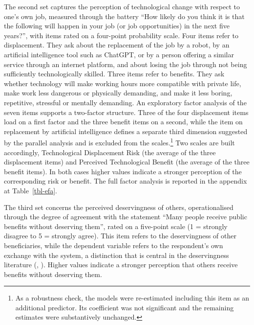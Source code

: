\documentclass[
  12pt,
]{article}
\begin{document}
The second set captures the perception of technological change with
respect to one's own job, measured through the battery ``How likely do
you think it is that the following will happen in your job (or job
opportunities) in the next five years?'', with items rated on a
four-point probability scale. Four items refer to displacement. They ask
about the replacement of the job by a robot, by an artificial
intelligence tool such as ChatGPT, or by a person offering a similar
service through an internet platform, and about losing the job through
not being sufficiently technologically skilled. Three items refer to
benefits. They ask whether technology will make working hours more
compatible with private life, make work less dangerous or physically
demanding, and make it less boring, repetitive, stressful or mentally
demanding. An exploratory factor analysis of the seven items supports a
two-factor structure. Three of the four displacement items load on a
first factor and the three benefit items on a second, while the item on
replacement by artificial intelligence defines a separate third
dimension suggested by the parallel analysis and is excluded from the
scales.\footnote{As a robustness check, the models were re-estimated
  including this item as an additional predictor. Its coefficient was
  not significant and the remaining estimates were substantively
  unchanged.} Two scales are built accordingly, Technological
Displacement Risk (the average of the three displacement items) and
Perceived Technological Benefit (the average of the three benefit
items). In both cases higher values indicate a stronger perception of
the corresponding risk or benefit. The full factor analysis is reported
in the appendix at Table~\ref{tbl-efa}.

The third set concerns the perceived deservingness of others,
operationalised through the degree of agreement with the statement
``Many people receive public benefits without deserving them'', rated on
a five-point scale (1 = strongly disagree to 5 = strongly agree). This
item refers to the deservingness of other beneficiaries, while the
dependent variable refers to the respondent's own exchange with the
system, a distinction that is central in the deservingness literature
(,
). Higher values indicate a
stronger perception that others receive benefits without deserving them.
\end{document}
